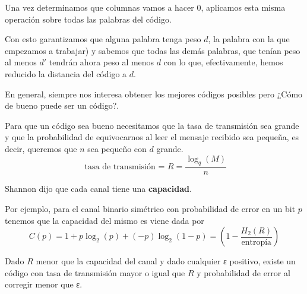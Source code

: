 Una vez determinamos que columnas vamos a hacer 0, aplicamos esta misma operación sobre todas las palabras del código.

Con esto garantizamos que alguna palabra tenga peso $d$, la palabra con la que empezamos a trabajar) y sabemos que todas las demás palabras, que tenían peso al menos $d'$ tendrán ahora peso al menos $d$ con lo que, efectivamente, hemos reducido la distancia del código a $d$.


En general, siempre nos interesa obtener los mejores códigos posibles pero ¿Cómo de bueno puede ser un código?.

Para que un código sea bueno necesitamos que la tasa de transmisión sea grande y que la probabilidad de equivocarnos al leer el mensaje recibido sea pequeña, es decir, queremos que $n$ sea pequeño con $d$ grande.
\[\text{ tasa de transmisión = } R = \frac{\log_q(M)}{n}\]

Shannon dijo que cada canal tiene una \textbf{capacidad}.

Por ejemplo, para el canal binario simétrico con probabilidad de error en un bit $p$ tenemos que la capacidad del mismo es viene dada por
\[C(p)=1+p\log_2(p)+(-p)\log_2(1-p)=\left(1-\frac{H_2(R)}{\text{entropía}}\right)\]

\begin{theorem}
Dado $R$ menor que la capacidad del canal y dado cualquier ε positivo, existe un código con tasa de transmisión mayor o igual que $R$ y probabilidad de error al corregir menor que ε.
\end{theorem}
